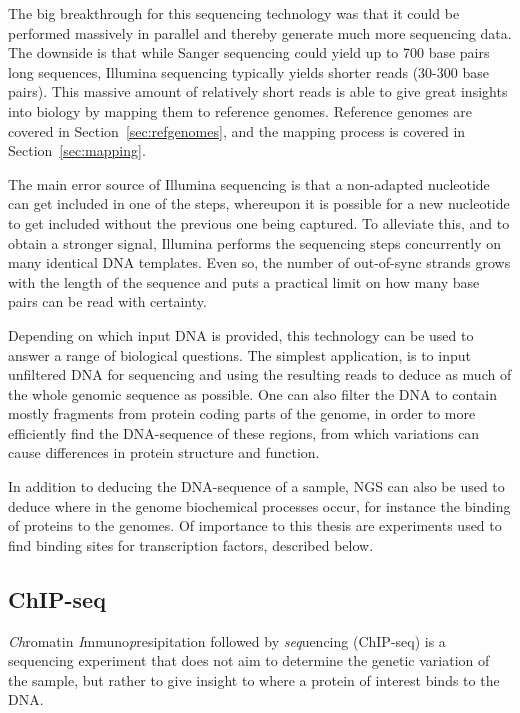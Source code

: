 The big breakthrough for this sequencing technology was that it could be performed massively in parallel and thereby generate much more sequencing data.
The downside is that while Sanger sequencing could yield up to 700 base pairs long sequences, Illumina sequencing typically yields shorter reads (30-300 base pairs).
This massive amount of relatively short reads is able to give great insights into biology by mapping them to reference genomes.
Reference genomes are covered in Section~\ref{sec:refgenomes}, and the mapping process is covered in Section~\ref{sec:mapping}.


The main error source of Illumina sequencing is that a non-adapted nucleotide can get included in one of the steps, whereupon it is possible for a new nucleotide to get included without the previous one being captured.
To alleviate this, and to obtain a stronger signal, Illumina performs the sequencing steps concurrently on many identical DNA templates. Even so, the number of out-of-sync strands grows with the length of the sequence and puts a practical limit on how many base pairs can be read with certainty.

Depending on which input DNA is provided, this technology can be used to answer a range of biological questions.
The simplest application, is to input unfiltered DNA for sequencing and using the resulting reads to deduce as much of the whole genomic sequence as possible. One can also filter the DNA to contain mostly fragments from protein coding parts of the genome, in order to more efficiently find the DNA-sequence of these regions, from which variations can cause differences in protein structure and function.

In addition to deducing the DNA-sequence of a sample, NGS can also be used to deduce where in the genome biochemical processes occur, for instance the binding of proteins to the genomes. Of importance to this thesis are experiments used to find binding sites for transcription factors, described below.

\subsection{ChIP-seq}
\emph{Ch}romatin \emph{I}mmuno\emph{p}resipitation  followed by \emph{seq}uencing (ChIP-seq) is a sequencing experiment that does not aim to determine the genetic variation of the sample, but rather to give insight to where a protein of interest binds to the DNA.


